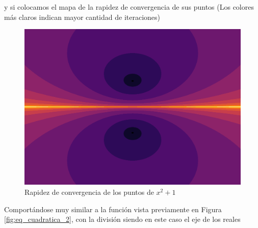 y si colocamos el mapa de la rapidez de convergencia de sus puntos (Los colores más claros indican mayor cantidad de iteraciones)
\begin{figure}[H]
    \centering
    \includegraphics[scale=0.26]{images/eq3-2.png}
    \caption{Rapidez de convergencia de los puntos de $ x^2+1$}
    \label{fig:eq_cuad_compleja_2}
\end{figure}
Comportándose muy similar a la función vista previamente en Figura \ref{fig:eq_cuadratica_2}, con la división siendo en este caso el eje de los reales 

